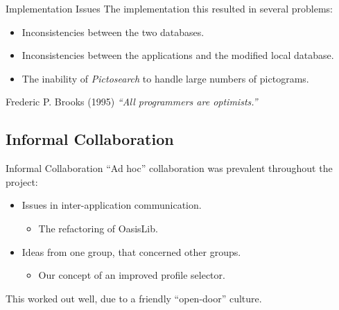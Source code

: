 \begin{frame}{Implementation Issues}
	The implementation this resulted in several problems:
	\begin{itemize}
		\item<1> Inconsistencies between the two databases.
		\item<2> Inconsistencies between the applications and the modified local database.
		\item<3> The inability of \textit{Pictosearch} to handle large numbers of pictograms.
	\end{itemize}
	\pause[4]
	\begin{block}{Frederic P. Brooks (1995)}
    	\textit{``All programmers are optimists.''}
   	\end{block}
\end{frame}


\subsection{Informal Collaboration}

\begin{frame}{Informal Collaboration}
	``Ad hoc'' collaboration was prevalent throughout the project:
	\begin{itemize}
		\item<1> Issues in inter-application communication.
		\begin{itemize}
			\item<1> The refactoring of OasisLib.
		\end{itemize}
		\item<2> Ideas from one group, that concerned other groups.
		\begin{itemize}
			\item<2> Our concept of an improved profile selector.
		\end{itemize}
	\end{itemize}
	\vspace{\baselineskip}
	\pause[3]
	This worked out well, due to a friendly ``open-door'' culture.
\end{frame}

